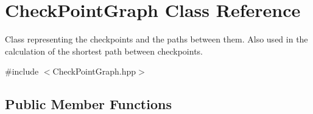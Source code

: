 \hypertarget{classCheckPointGraph}{\section{Check\-Point\-Graph Class Reference}
\label{classCheckPointGraph}
}


Class representing the checkpoints and the paths between them. Also used in the calculation of the shortest path between checkpoints.  




{\ttfamily \#include $<$Check\-Point\-Graph.\-hpp$>$}

\subsection*{Public Member Functions}
